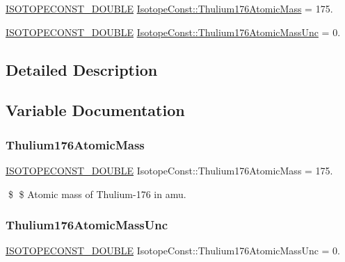 \begin{DoxyCompactItemize}
\item 
\mbox{\hyperlink{group___isotope_const-_macros_ga8f45a7272ce02c0b4c65c44636ed719a}{I\+S\+O\+T\+O\+P\+E\+C\+O\+N\+S\+T\+\_\+\+D\+O\+U\+B\+LE}} \mbox{\hyperlink{group___isotope_const-_thulium-_tm176_gab22c2b1f82572876727b2360406ae9c5}{Isotope\+Const\+::\+Thulium176\+Atomic\+Mass}} = 175.
\item 
\mbox{\hyperlink{group___isotope_const-_macros_ga8f45a7272ce02c0b4c65c44636ed719a}{I\+S\+O\+T\+O\+P\+E\+C\+O\+N\+S\+T\+\_\+\+D\+O\+U\+B\+LE}} \mbox{\hyperlink{group___isotope_const-_thulium-_tm176_gae793d2abdc366ae911d9102368bb28bf}{Isotope\+Const\+::\+Thulium176\+Atomic\+Mass\+Unc}} = 0.
\end{DoxyCompactItemize}


\subsection{Detailed Description}


\subsection{Variable Documentation}
\mbox{\label{group___isotope_const-_thulium-_tm176_gab22c2b1f82572876727b2360406ae9c5}} 
\subsubsection{\texorpdfstring{Thulium176\+Atomic\+Mass}{Thulium176AtomicMass}}
{\footnotesize\ttfamily \mbox{\hyperlink{group___isotope_const-_macros_ga8f45a7272ce02c0b4c65c44636ed719a}{I\+S\+O\+T\+O\+P\+E\+C\+O\+N\+S\+T\+\_\+\+D\+O\+U\+B\+LE}} Isotope\+Const\+::\+Thulium176\+Atomic\+Mass = 175.}

\$ \$ Atomic mass of Thulium-\/176 in amu. \mbox{\label{group___isotope_const-_thulium-_tm176_gae793d2abdc366ae911d9102368bb28bf}} 
\subsubsection{\texorpdfstring{Thulium176\+Atomic\+Mass\+Unc}{Thulium176AtomicMassUnc}}
{\footnotesize\ttfamily \mbox{\hyperlink{group___isotope_const-_macros_ga8f45a7272ce02c0b4c65c44636ed719a}{I\+S\+O\+T\+O\+P\+E\+C\+O\+N\+S\+T\+\_\+\+D\+O\+U\+B\+LE}} Isotope\+Const\+::\+Thulium176\+Atomic\+Mass\+Unc = 0.}


